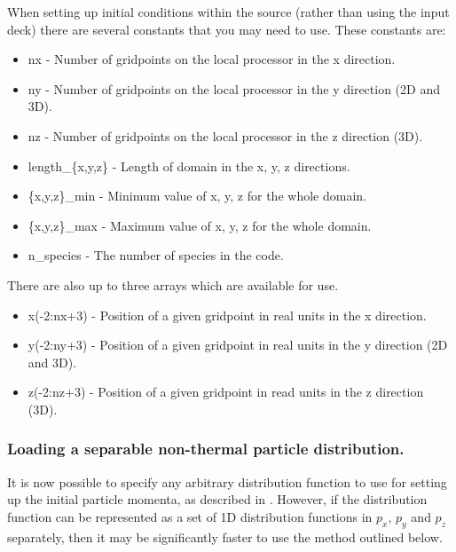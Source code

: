 When setting up initial conditions within the {\EPOCH} source (rather than
using the input deck)
there are several constants that you may need to use. These constants are:
\begin{itemize}
\item nx - Number of gridpoints on the local processor in the x direction.
\item ny - Number of gridpoints on the local processor in the y direction (2D
  and 3D).
\item nz - Number of gridpoints on the local processor in the z direction (3D).
\item length\_\{x,y,z\} - Length of domain in the x, y, z directions.
\item \{x,y,z\}\_min - Minimum value of x, y, z for the whole domain.
\item \{x,y,z\}\_max - Maximum value of x, y, z for the whole domain.
\item n\_species - The number of species in the code.
\end{itemize}

There are also up to three arrays which are available for use.
\begin{itemize}
\item x(-2:nx+3) - Position of a given gridpoint in real units in the x
  direction.
\item y(-2:ny+3) - Position of a given gridpoint in real units in the y
  direction (2D and 3D).
\item z(-2:nz+3) - Position of a given gridpoint in read units in the z
  direction (3D).
\end{itemize}

\subsubsection{Loading a separable non-thermal particle distribution.}

It is now possible to specify any arbitrary distribution function to use
for setting up the initial particle momenta, as described in
. However, if the distribution function can be
represented as a set of 1D distribution functions in $p_x,\,p_y$ and $p_z$
separately, then it may be significantly faster to use the method outlined
below.

